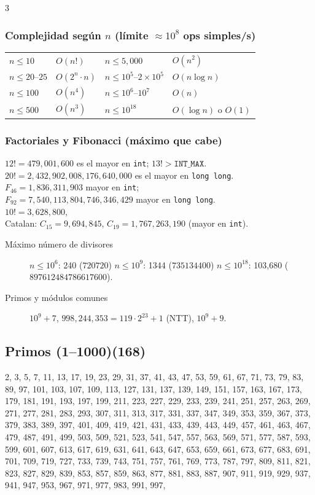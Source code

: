 \documentclass[8pt, spanish, mexico, letterpaper]{extarticle}
\newcommand{\<}{<}
\begin{document}
\begin{multicols*}{3}
\subsubsection*{Complejidad según $n$ (límite $\approx 10^8$ ops simples/s)}
\begin{tabular}{ll|ll}
    $n \le 10$ & \(O(n!)\) & $n \le 5{,}000$ & \(O(n^2)\) \\
    $n \le 20$--$25$ & \(O(2^n\cdot n)\) & $n \le 10^5$--$2\times10^5$ & \(O(n\log n)\) \\
    $n \le 100$ & \(O(n^4)\) & $n \le 10^6$--$10^7$ & \(O(n)\) \\
    $n \le 500$ & \(O(n^3)\) & $n \le 10^{18}$ & \(O(\log n)\) o \(O(1)\) \\
\end{tabular}

\subsubsection*{Factoriales y Fibonacci (máximo que cabe)}
\(12! = 479{,}001{,}600\) es el mayor en \texttt{int}; \(13!>\texttt{INT\_MAX}\).\\
\(20! = 2{,}432{,}902{,}008{,}176{,}640{,}000\) es el mayor en \texttt{long long}.\\
\(F_{46} = 1{,}836{,}311{,}903\) mayor en \texttt{int};\\
\(F_{92}=7{,}540{,}113{,}804{,}746{,}346{,}429\) mayor en \texttt{long long}.\\
\(10! = 3{,}628{,}800\), \\
Catalan:  \(C_{15}=9{,}694{,}845\), \(C_{19}=1{,}767{,}263{,}190\) (mayor en \texttt{int}).

\begin{description}
\item[Máximo número de divisores]
$n\le10^6$: 240 ($720720$) \quad $n\le 10^9$: 1344 ($735134400$) \quad $n\le10^{18}$: 103,680 ($897612484786617600$).

\item[Primos y módulos comunes]
\(10^9+7\), \quad \(998{,}244{,}353 = 119\cdot2^{23}+1\) (NTT), \quad \(10^9+9\).
\end{description}

\subsection{Primos (1--1000)(168)}
\tiny
2, 3, 5, 7, 11, 13, 17, 19, 23, 29, 31, 37, 41, 43, 47, 53, 59, 61, 67, 71, 73, 79, 83, 89, 97, 101, 103, 107, 109, 113, 127, 131, 137, 139, 149, 151, 157, 163, 167, 173, 179, 181, 191, 193, 197, 199, 211, 223, 227, 229, 233, 239, 241, 251, 257, 263, 269, 271, 277, 281, 283, 293, 307, 311, 313, 317, 331, 337, 347, 349, 353, 359, 367, 373, 379, 383, 389, 397, 401, 409, 419, 421, 431, 433, 439, 443, 449, 457, 461, 463, 467, 479, 487, 491, 499, 503, 509, 521, 523, 541, 547, 557, 563, 569, 571, 577, 587, 593, 599, 601, 607, 613, 617, 619, 631, 641, 643, 647, 653, 659, 661, 673, 677, 683, 691, 701, 709, 719, 727, 733, 739, 743, 751, 757, 761, 769, 773, 787, 797, 809, 811, 821, 823, 827, 829, 839, 853, 857, 859, 863, 877, 881, 883, 887, 907, 911, 919, 929, 937, 941, 947, 953, 967, 971, 977, 983, 991, 997, 


\end{multicols*}
\end{document}
